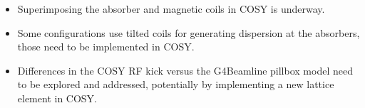\documentclass[portrait,a0paper,fontscale=0.285]{baposter} %
\begin{document}
\begin{poster}

{
\begin{itemize}
\item Superimposing the absorber and magnetic coils in COSY is underway.
\item Some configurations use tilted coils for generating dispersion at the absorbers, those need to be implemented in COSY.
\item Differences in the COSY RF kick versus the G4Beamline pillbox model need to be explored and addressed, potentially by implementing a new lattice element in COSY.
\end{itemize}
}

\end{poster}
\end{document}
